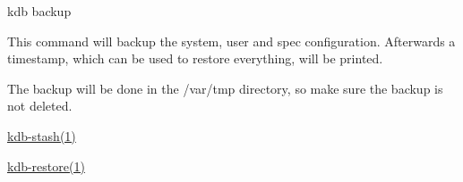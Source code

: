 {\ttfamily kdb backup}

This command will backup the {\ttfamily system}, {\ttfamily user} and {\ttfamily spec} configuration. Afterwards a timestamp, which can be used to restore everything, will be printed.

The backup will be done in the {\ttfamily /var/tmp} directory, so make sure the backup is not deleted.


\begin{DoxyCode}{0}
\end{DoxyCode}



\begin{DoxyItemize}
\item \mbox{\hyperlink{doc_help_kdb-stash_md}{kdb-\/stash(1)}}
\item \mbox{\hyperlink{doc_help_kdb-restore_md}{kdb-\/restore(1)}} 
\end{DoxyItemize}